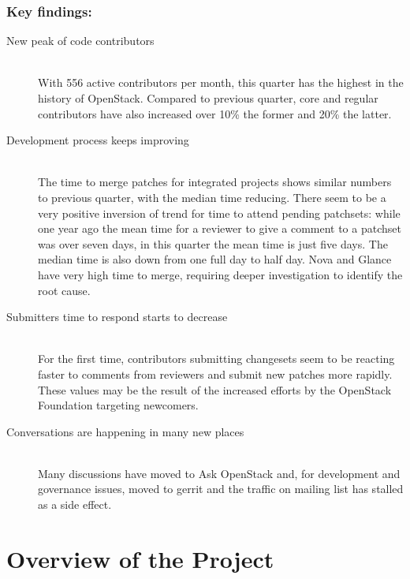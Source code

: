 \documentclass[a4wide,11pt]{report}
\begin{document}
\subsection*{Key findings:}
\begin{description}

\item[New peak of code contributors] \hfill \\
With 556 active contributors per month, this quarter has the highest
in the history of OpenStack. Compared to previous quarter, core and
regular contributors have also increased over 10\% the former and 20\%
the latter.

\item[Development process keeps improving] \hfill \\
The time to merge patches for integrated projects shows similar
numbers to previous quarter, with the median time reducing. There seem
to be a very positive inversion of trend for time to attend pending
patchsets: while one year ago the mean time for a reviewer to give a
comment to a patchset was over seven days, in this quarter the mean
time is just five days. The median time is also down from one full day
to half day. Nova and Glance have very high time to merge, requiring
deeper investigation to identify the root cause.

\item[Submitters time to respond starts to decrease] \hfill \\
For the first time, contributors submitting changesets seem to be
reacting faster to comments from reviewers and submit new patches more
rapidly. These values may be the result of the increased efforts by
the OpenStack Foundation targeting newcomers.

\item[Conversations are happening in many new places] \hfill \\
Many discussions have moved to Ask OpenStack and, for development and
governance issues, moved to gerrit and the traffic on mailing list
has stalled as a side effect.

\end{description}

\setcounter{tocdepth}{4}
\setcounter{secnumdepth}{4}
\tableofcontents


\chapter{Overview of the Project}
\end{document}
